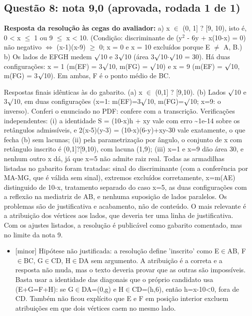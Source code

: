 \documentclass{article}%
\begin{document}
\subsection*{Questão 8: nota 9,0 (aprovada, rodada 1 de 1)}%
\textbf{Resposta da resolução às cegas do avaliador:} a) x $\in$ (0, 1{]} ? {[}9, 10), isto é, 0 < x $\leq$ 1 ou 9 $\leq$ x < 10. (Condição: discriminante de (y$^2$ - 6y + x(10-x) = 0) não negativo $\Leftrightarrow$ (x-1)(x-9) $\geq$ 0; x = 0 e x = 10 excluídos porque E $\neq$ A, B.)\newline%
\newline%
b) Os lados de EFGH medem $\surd$10 e 3$\surd$10 (área 3$\surd$10$\cdot$$\surd$10 = 30). Há duas configurações: x = 1 (m(EF) = 3$\surd$10, m(FG) = $\surd$10) e x = 9 (m(EF) = $\surd$10, m(FG) = 3$\surd$10). Em ambas, F é o ponto médio de BC.\par %
Respostas finais idênticas às do gabarito. (a) x $\in$ (0,1{]} ? {[}9,10). (b) Lados $\surd$10 e 3$\surd$10, em duas configurações (x=1: m(EF)=3$\surd$10, m(FG)=$\surd$10; x=9: o inverso). Conferi o enunciado no PDF: confere com a transcrição. Verificações independentes: (i) a identidade S = (10-x)h + xy vale com erro \textasciitilde{}1e{-}14 sobre os retângulos admissíveis, e 2(x-5)(y-3) = (10-x)(6-y)+xy-30 vale exatamente, o que fecha (b) sem lacunas; (ii) pela parametrização por ângulo, o conjunto de x com retângulo inscrito é (0,1{]}?{[}9,10), com lacuna (1,9); (iii) x=1 e x=9 dão área 30, e nenhum outro x dá, já que x=5 não admite raiz real. Todas as armadilhas listadas no gabarito foram tratadas: sinal do discriminante (com a conferência por MA{-}MG, que é válida sem sinal), extremos excluídos corretamente, x=m(AE) distinguido de 10-x, tratamento separado do caso x=5, as duas configurações com a reflexão na mediatriz de AB, e nenhuma suposição de lados paralelos. Os problemas são de justificativa e acabamento, não de conteúdo. O mais relevante é a atribuição dos vértices aos lados, que deveria ter uma linha de justificativa. Com os ajustes listados, a resolução é publicável como gabarito comentado, mas no limite da nota 9.%
\begin{itemize}%
\item%
{[}minor{]} Hipótese não justificada: a resolução define 'inscrito' como E$\in$AB, F$\in$BC, G$\in$CD, H$\in$DA sem argumento. A atribuição é a correta e a resposta não muda, mas o texto deveria provar que as outras são impossíveis. Basta usar a identidade das diagonais que o próprio candidato usa (E+G=F+H): se G$\in$DA=(0,g) e H$\in$CD=(h,6), então h=x-10<0, fora de CD. Também não ficou explícito que E e F em posição interior excluem atribuições em que dois vértices caem no mesmo lado.%

\end{itemize}$$
\end{document}
